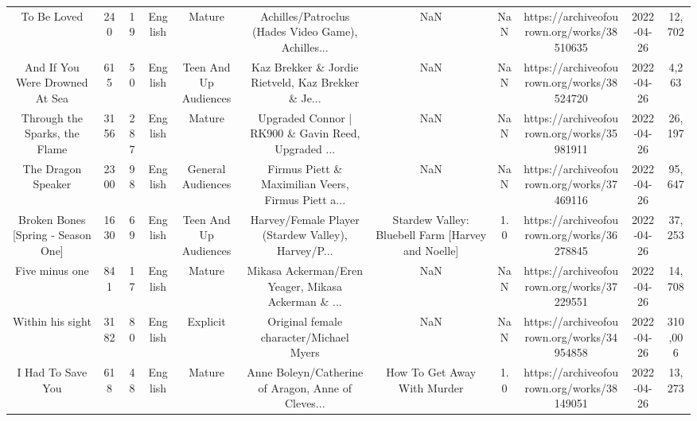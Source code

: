 \begin{table}[h!]
{\begin{tabular}{|c|c|c|c|c|c|c|c|c|c|c|}
                                       To Be Loved &    240 &    19 &  English &                Mature & Achilles/Patroclus (Hades Video Game), Achilles... &                                                NaN &   NaN & https://archiveofourown.org/works/38510635 & 2022-04-26 &    12,702 \\
                    And If You Were Drowned At Sea &    615 &    50 &  English & Teen And Up Audiences & Kaz Brekker \& Jordie Rietveld, Kaz Brekker \& Je... &                                                NaN &   NaN & https://archiveofourown.org/works/38524720 & 2022-04-26 &     4,263 \\
                     Through the Sparks, the Flame &   3156 &   287 &  English &                Mature & Upgraded Connor | RK900 \& Gavin Reed, Upgraded ... &                                                NaN &   NaN & https://archiveofourown.org/works/35981911 & 2022-04-26 &    26,197 \\
                                The Dragon Speaker &   2300 &    98 &  English &     General Audiences & Firmus Piett \& Maximilian Veers, Firmus Piett a... &                                                NaN &   NaN & https://archiveofourown.org/works/37469116 & 2022-04-26 &    95,647 \\
                Broken Bones [Spring - Season One] &   1630 &    69 &  English & Teen And Up Audiences & Harvey/Female Player (Stardew Valley), Harvey/P... &  Stardew Valley: Bluebell Farm [Harvey and Noelle] &   1.0 & https://archiveofourown.org/works/36278845 & 2022-04-26 &    37,253 \\
                                    Five minus one &    841 &    17 &  English &                Mature & Mikasa Ackerman/Eren Yeager, Mikasa Ackerman \& ... &                                                NaN &   NaN & https://archiveofourown.org/works/37229551 & 2022-04-26 &    14,708 \\
                                  Within his sight &   3182 &    80 &  English &              Explicit &            Original female character/Michael Myers &                                                NaN &   NaN & https://archiveofourown.org/works/34954858 & 2022-04-26 &   310,006 \\
                                 I Had To Save You &    618 &    48 &  English &                Mature & Anne Boleyn/Catherine of Aragon, Anne of Cleves... &                        How To Get Away With Murder &   1.0 & https://archiveofourown.org/works/38149051 & 2022-04-26 &    13,273 \\

\end{tabular}}
\end{table}
